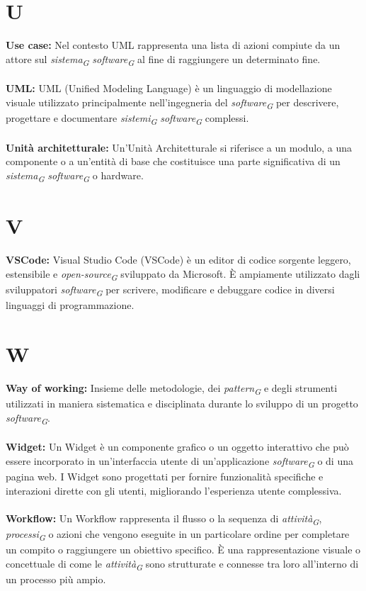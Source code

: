 \documentclass{article}
\begin{document}
\section*{U}
{}
\textbf{Use case:} Nel contesto UML rappresenta una lista di azioni compiute da un attore sul \textit{sistema}\textsubscript{\textit{G}} \textit{software}\textsubscript{\textit{G}} al fine di raggiungere un determinato fine.
\\
\\
\textbf{UML:} UML (Unified Modeling Language) è un linguaggio di modellazione visuale utilizzato principalmente nell'ingegneria del \textit{software}\textsubscript{\textit{G}} per descrivere, progettare e documentare \textit{sistemi}\textsubscript{\textit{G}} \textit{software}\textsubscript{\textit{G}} complessi.
\\
\\
\textbf{Unità architetturale:} Un'Unità Architetturale si riferisce a un modulo, a una componente o a un'entità di base che costituisce una parte significativa di un \textit{sistema}\textsubscript{\textit{G}} \textit{software}\textsubscript{\textit{G}} o hardware. 
\pagebreak
\section*{V}
{}
\textbf{VSCode:} Visual Studio Code (VSCode) è un editor di codice sorgente leggero, estensibile e \textit{open-source}\textsubscript{\textit{G}} sviluppato da Microsoft. È ampiamente utilizzato dagli sviluppatori \textit{software}\textsubscript{\textit{G}} per scrivere, modificare e debuggare codice in diversi linguaggi di programmazione.
\pagebreak
\section*{W}
{}
\textbf{Way of working:} Insieme delle metodologie, dei \textit{pattern}\textsubscript{\textit{G}} e degli strumenti utilizzati in maniera sistematica e disciplinata durante lo sviluppo di un progetto \textit{software}\textsubscript{\textit{G}}.
\\
\\
\textbf{Widget:} Un Widget è un componente grafico o un oggetto interattivo che può essere incorporato in un'interfaccia utente di un'applicazione \textit{software}\textsubscript{\textit{G}} o di una pagina web. I Widget sono progettati per fornire funzionalità specifiche e interazioni dirette con gli utenti, migliorando l'esperienza utente complessiva.
\\
\\
\textbf{Workflow:} Un Workflow rappresenta il flusso o la sequenza di \textit{attività}\textsubscript{\textit{G}}, \textit{processi}\textsubscript{\textit{G}} o azioni che vengono eseguite in un particolare ordine per completare un compito o raggiungere un obiettivo specifico. È una rappresentazione visuale o concettuale di come le \textit{attività}\textsubscript{\textit{G}} sono strutturate e connesse tra loro all'interno di un processo più ampio.
\end{document}
